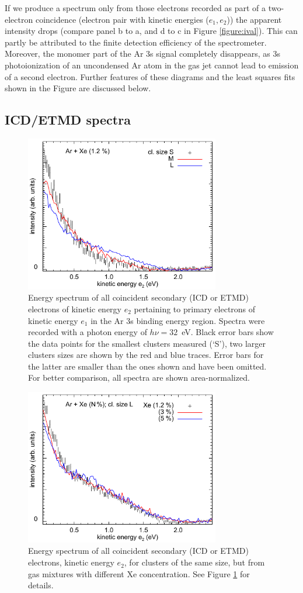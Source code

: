 \documentclass[journal=jpccck,manuscript=article]{achemso}
\begin{document}
If we produce a spectrum only from those electrons recorded as part of a two-electron coincidence (electron pair with kinetic energies ($e_1,e_2$)) the apparent intensity drops (compare panel b to a, and d to c in Figure \ref{figure:ival}).
This can partly be attributed to the finite detection efficiency of the spectrometer. 
Moreover, the monomer part of the Ar 3s signal completely disappears, as 3s photoionization of an uncondensed Ar atom in the gas jet cannot lead to emission of a second electron. 
Further features of these diagrams and the least squares fits shown in the Figure are discussed below.
%
%
\subsection{ICD/ETMD spectra}
%
\begin{figure}[ht]
 \centering
 \includegraphics[width=8.5cm]{figure_icd_12.pdf}
 \caption{
Energy spectrum of all coincident secondary (ICD or ETMD) electrons of kinetic energy $e_2$ pertaining to primary electrons of kinetic energy $e_1$ in the Ar 3s binding energy region. 
Spectra were recorded with a photon energy of $h\nu = 32$~eV. 
Black error bars show the data points for the smallest clusters measured (`S'), two larger clusters sizes are shown by the red and blue traces. 
Error bars for the latter are smaller than the ones shown and have been omitted.
For better comparison, all spectra are shown area-normalized. 
}
 \label{figure:icd_12}
\end{figure}
%
%
\begin{figure}[ht]
 \centering
 \includegraphics[width=8.5cm]{figure_icd_l.pdf}
 \caption{
Energy spectrum of all coincident secondary (ICD or ETMD) electrons, kinetic energy $e_2$, for clusters of the same size, but from gas mixtures with different Xe concentration. See Figure \protect\ref{figure:icd_12} for details.
}
 \label{figure:icd_l}
\end{figure}
\end{document}

